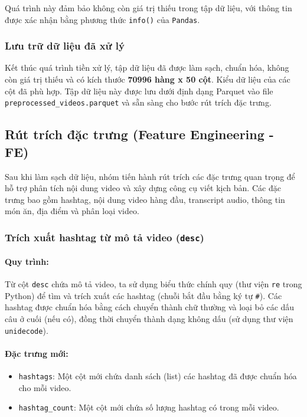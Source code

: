 Quá trình này đảm bảo không còn giá trị thiếu trong tập dữ liệu, với thông tin được xác nhận bằng phương thức \texttt{info()} của \texttt{Pandas}.

\subsubsection{Lưu trữ dữ liệu đã xử lý}

Kết thúc quá trình tiền xử lý, tập dữ liệu đã được làm sạch, chuẩn hóa, không còn giá trị thiếu và có kích thước \textbf{70996 hàng x 50 cột}. Kiểu dữ liệu của các cột đã phù hợp. Tập dữ liệu này được lưu dưới định dạng Parquet vào file \texttt{preprocessed\_videos.parquet} và sẵn sàng cho bước rút trích đặc trưng.

\subsection{Rút trích đặc trưng (Feature Engineering - FE)}

Sau khi làm sạch dữ liệu, nhóm tiến hành rút trích các đặc trưng quan trọng để hỗ trợ phân tích nội dung video và xây dựng công cụ viết kịch bản. Các đặc trưng bao gồm hashtag, nội dung video hàng đầu, transcript audio, thông tin món ăn, địa điểm và phân loại video.

\subsubsection{Trích xuất hashtag từ mô tả video (\texttt{desc})}

\paragraph{Quy trình:}
Từ cột \texttt{desc} chứa mô tả video, ta sử dụng biểu thức chính quy (thư viện \texttt{re} trong Python) để tìm và trích xuất các hashtag (chuỗi bắt đầu bằng ký tự \texttt{\#}). Các hashtag được chuẩn hóa bằng cách chuyển thành chữ thường và loại bỏ các dấu câu ở cuối (nếu có), đồng thời chuyển thành dạng không dấu (sử dụng thư viện \texttt{unidecode}).

\paragraph{Đặc trưng mới:}
\begin{itemize}
    \item \texttt{hashtags}: Một cột mới chứa danh sách (list) các hashtag đã được chuẩn hóa cho mỗi video.
    
    \item \texttt{hashtag\_count}: Một cột mới chứa số lượng hashtag có trong mỗi video.
\end{itemize}

